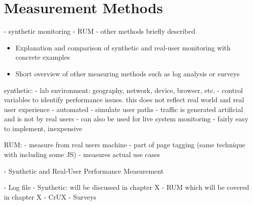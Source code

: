









\section{Measurement Methods}


- synthetic monitoring
- RUM
- other methods briefly described


\begin{itemize}
\item Explanation and comparison of synthetic and real-user monitoring with concrete examples
\item Short overview of other measuring methods such as log analysis or surveys
\end{itemize}








synthetic:
- lab environment: geography, network, device, browser, etc.
- control variables to identify performance issues. this does not reflect real world and real user experience
- automated
- simulate user paths
- traffic is generated artificial and is not by real users
 - can also be used for live system monitoring
 - fairly easy to implement, inexpensive

RUM:
- measure from real users machine
- part of page tagging (same technique with including some JS)
- measures actual use cases



- Synthetic and Real-User Performance Measurement



- Log file
- Synthetic: will be discussed in chapter X
- RUM which will be covered in chapter X
- CrUX
- Surveys


